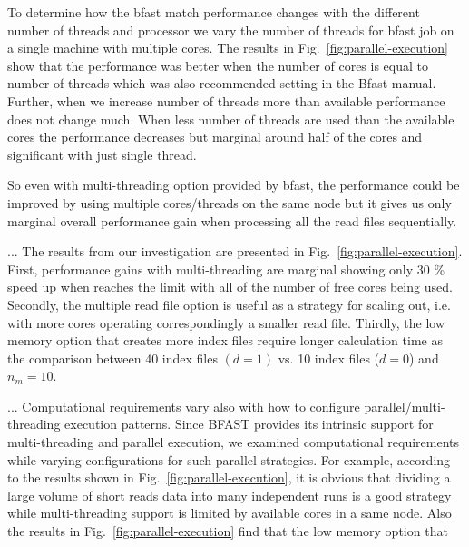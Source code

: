 \documentclass{acm_proc_article-sp}
\begin{document}
To determine how the bfast match performance changes with the different number of threads and 
processor we vary the number of threads for bfast job on a single machine with multiple cores. 
The results in Fig.~\ref{fig:parallel-execution} show that the performance was better when the number 
of cores is equal to number of threads which was also recommended setting in the Bfast manual. 
Further, when we increase number of threads more than available performance does not change much. 
When less number of threads are used than the available cores the performance 
decreases but marginal around half of the cores and significant with just single thread.


So even with multi-threading option provided by bfast, the performance
could be improved by using multiple cores/threads on the same node but
it gives us only marginal overall performance gain when processing all
the read files sequentially.

...  The results from our investigation are presented in
Fig.~\ref{fig:parallel-execution}. First, performance gains with
multi-threading are marginal showing only 30 \% speed up when reaches
the limit with all of the number of free cores being used.  Secondly,
the multiple read file option is useful as a strategy for scaling out,
i.e. with more cores operating correspondingly a smaller read file.
Thirdly, the low memory option that creates more index files require
longer calculation time as the comparison between 40 index files $(d =
1)$ vs. 10 index files ($ d = 0 $) and $n_m = 10$.


...  Computational requirements vary also with
how to configure parallel/multi-threading execution patterns.  Since
BFAST provides its intrinsic support for multi-threading and parallel
execution, we examined computational requirements while varying
configurations for such parallel strategies.  For example, according
to the results shown in Fig.~\ref{fig:parallel-execution}, it is
obvious that dividing a large volume of short reads data into many
independent runs is a good strategy while multi-threading support is
limited by available cores in a same node.  Also the results in
Fig.~\ref{fig:parallel-execution} find that the low memory option that
\end{document}
